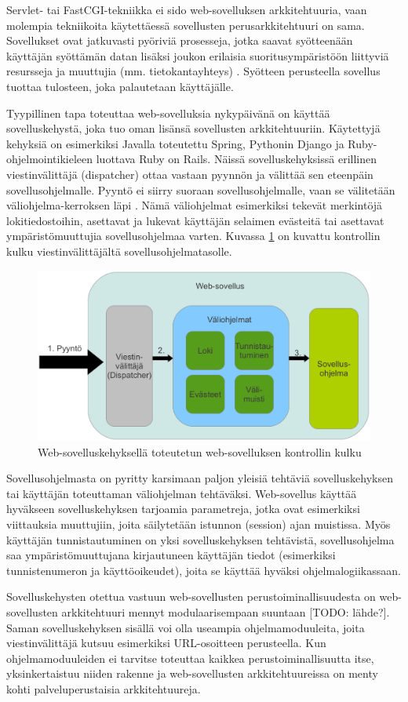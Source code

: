 Servlet- tai FastCGI-tekniikka ei sido web-sovelluksen arkkitehtuuria, vaan molempia tekniikoita käytettäessä sovellusten perusarkkitehtuuri on sama. Sovellukset ovat jatkuvasti pyöriviä prosesseja, jotka saavat syötteenään käyttäjän syöttämän datan lisäksi joukon erilaisia suoritusympäristöön liittyviä resursseja ja muuttujia (mm. tietokantayhteys) \cite{uml}. Syötteen perusteella sovellus tuottaa tulosteen, joka palautetaan käyttäjälle.

Tyypillinen tapa toteuttaa web-sovelluksia nykypäivänä on käyttää sovelluskehystä, joka tuo oman lisänsä sovellusten arkkitehtuuriin. Käytettyjä kehyksiä on esimerkiksi Javalla toteutettu Spring, Pythonin Django ja Ruby-ohjelmointikieleen luottava Ruby on Rails. Näissä sovelluskehyksissä erillinen viestinvälittäjä (dispatcher) ottaa vastaan pyynnön ja välittää sen eteenpäin sovellusohjelmalle. Pyyntö ei siirry suoraan sovellusohjelmalle, vaan se välitetään väliohjelma-kerroksen läpi \cite{ruby2011agile}. Nämä väliohjelmat esimerkiksi tekevät merkintöjä lokitiedostoihin, asettavat ja lukevat käyttäjän selaimen evästeitä tai asettavat ympäristömuuttujia sovellusohjelmaa varten. Kuvassa \ref{dispatcher} on kuvattu kontrollin kulku viestinvälittäjältä sovellusohjelmatasolle.

\begin{figure}[ht]
\centering
\includegraphics[width=\textwidth]{web/dispatcher.eps}
\caption{Web-sovelluskehyksellä toteutetun web-sovelluksen kontrollin kulku}%
\label{dispatcher}
\end{figure}

Sovellusohjelmasta on pyritty karsimaan paljon yleisiä tehtäviä sovelluskehyksen tai käyttäjän toteuttaman väliohjelman tehtäväksi. Web-sovellus käyttää hyväkseen sovelluskehyksen tarjoamia parametreja, jotka ovat esimerkiksi viittauksia muuttujiin, joita säilytetään istunnon (session) ajan muistissa. Myös käyttäjän tunnistautuminen on yksi sovelluskehyksen tehtävistä, sovellusohjelma saa ympäristömuuttujana kirjautuneen käyttäjän tiedot (esimerkiksi tunnistenumeron ja käyttöoikeudet), joita se käyttää hyväksi ohjelmalogiikassaan.

Sovelluskehysten otettua vastuun web-sovellusten perustoiminallisuudesta on web-sovellusten arkkitehtuuri mennyt modulaarisempaan suuntaan [TODO: lähde?]. Saman sovelluskehyksen sisällä voi olla useampia ohjelmamoduuleita, joita viestinvälittäjä kutsuu esimerkiksi URL-osoitteen perusteella. Kun ohjelmamoduuleiden ei tarvitse toteuttaa kaikkea perustoiminallisuutta itse, yksinkertaistuu niiden rakenne ja web-sovellusten arkkitehtuureissa on menty kohti palveluperustaisia arkkitehtuureja.